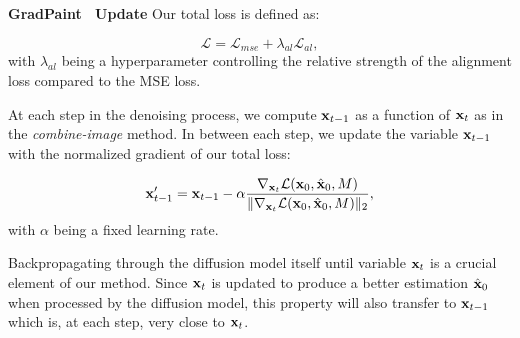 \noindent \textbf{GradPaint ~Update} Our total loss is defined as:

\begin{equation}
\mathcal{L} = \mathcal{L}_{mse} + \lambda_{al} \mathcal{L}_{al},
\end{equation}
with $\lambda_{al}$ being a hyperparameter controlling the relative strength of the alignment loss compared to the MSE loss.





At each step in the denoising process, we compute $\mathbf{x}_{t-1}$ as a function of $\mathbf{x}_t$ as in the \textit{combine-image} method. In between each step, we update the variable $\mathbf{x}_{t-1}$ with the normalized gradient of our total loss:

\begin{equation}
\mathbf{x}_{t-1}' = \mathbf{x}_{t-1} - \alpha \frac{\nabla_{\mathbf{x}_t}\mathcal{L}(\mathbf{x}_0, \hat{\mathbf{x}}_0, M)}{\Vert \nabla_{\mathbf{x}_t}\mathcal{L}(\mathbf{x}_0, \hat{\mathbf{x}}_0, M) \Vert_2},
\end{equation}
with $\alpha$ being a fixed learning rate.



Backpropagating through the diffusion model itself until variable $\mathbf{x}_t$ is a crucial element of our method. Since $\mathbf{x}_t$ is 
updated to produce a better estimation $\hat{\mathbf{x}}_0$
 when processed by the diffusion model, this property will also transfer to $\mathbf{x}_{t-1}$ which is, at each step, very 
 close to $\mathbf{x}_t$.





